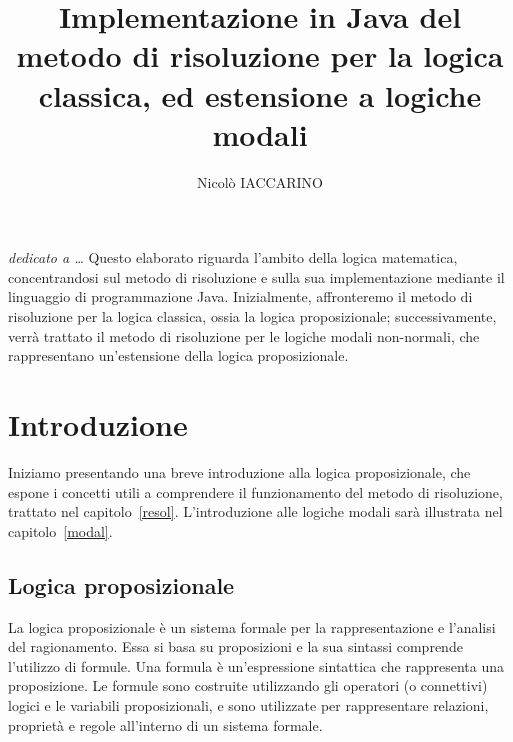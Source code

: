 \documentclass[a4paper,12pt]{report}
\begin{document}
\title{Implementazione in Java del metodo di risoluzione per la logica classica, ed estensione a logiche modali}
\author{Nicolò IACCARINO}
% 
%
\beforepreface
{}
        {\hfill \Large {\sl dedicato a \dots}}
% 
%
Questo elaborato riguarda l'ambito della logica matematica, concentrandosi sul metodo di risoluzione e sulla sua implementazione mediante il linguaggio di programmazione Java. Inizialmente, affronteremo il metodo di risoluzione per la logica classica, ossia la logica proposizionale; successivamente, verrà trattato il metodo di risoluzione per le logiche modali non-normali, che rappresentano un'estensione della logica proposizionale.
%
%

\afterpreface
\pagestyle{mystyle} %
% 
% 
\chapter{Introduzione}
\label{intro}

Iniziamo presentando una breve introduzione alla logica proposizionale, che espone i concetti utili a comprendere il funzionamento del metodo di risoluzione, trattato nel capitolo~\ref{resol}. L'introduzione alle logiche modali sarà illustrata nel capitolo~\ref{modal}.

\section{Logica proposizionale}
La logica proposizionale è un sistema formale per la rappresentazione e l'analisi del ragionamento. Essa si basa su proposizioni e la sua sintassi comprende l'utilizzo di formule. Una formula è un'espressione sintattica che rappresenta una proposizione. Le formule sono costruite utilizzando gli operatori (o connettivi) logici e le variabili proposizionali, e sono utilizzate per rappresentare relazioni, proprietà e regole all'interno di un sistema formale.
\end{document}
